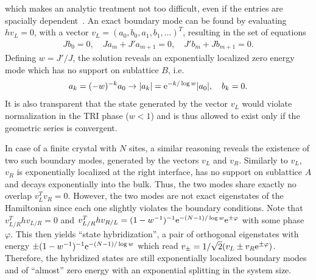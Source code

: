 which makes an analytic treatment not too difficult, even if the entries are spacially dependent~\cite{Asboth2016}.
An exact boundary mode can be found by evaluating $hv_L=0$, with a vector $v_L = (a_0,b_0,a_1,b_1,\dots)^T$, resulting in the set of equations
\begin{align}
    J b_0 = 0,
    \quad
    Ja_m + J' a_{m+1} = 0,
    \quad
    J' b_m + J b_{m+1} = 0.
\end{align}
Defining $w=J'/J$, the solution reveals an exponentially localized zero energy mode which has no support on sublattice $B$, i.e.
\begin{align}
    a_k=(-w)^{-k} a_0 \rightarrow |a_k| = \mathrm e^{-k/\log w}|a_0|,
    \quad
    b_k = 0.
    \label{eq:boundary_mode}
\end{align}
It is also transparent that the state generated by the vector $v_L$ would violate normalization in the TRI phase ($w<1$) and is thus allowed to exist only if the geometric series is convergent.

In case of a finite crystal with $N$ sites, a similar reasoning reveals the existence of two such boundary modes, generated by the vectors $v_L$ and $v_R$.
Similarly to $v_L$, $v_R$ is exponentially localized at the right interface, has no support on sublattice $A$ and decays exponentially into the bulk.
Thus, the two modes share exactly no overlap $v_L^T v_R = 0$.
However, the two modes are not exact eigenstates of the Hamiltonian since each one slightly violates the boundary conditions.
Note that $v_{L/R}^T h v_{L/R} = 0$ and $v_{L/R}^T h v_{R/L} = (1-w^{-1})^{-1}\mathrm e^{-(N-1)/\log w}\mathrm e^{\pm\varphi}$ with some phase $\varphi$.
This then yields ``state hybridization'', a pair of orthogonal eigenstates with energy $\pm(1-w^{-1})^{-1}\mathrm e^{-(N-1)/\log w}$ which read $v_\pm = 1/\sqrt2(v_L \pm v_R\mathrm e^{\pm\varphi})$.
Therefore, the hybridized states are still exponentially localized boundary modes and of ``almost'' zero energy with an exponential splitting in the system size.
%
%
